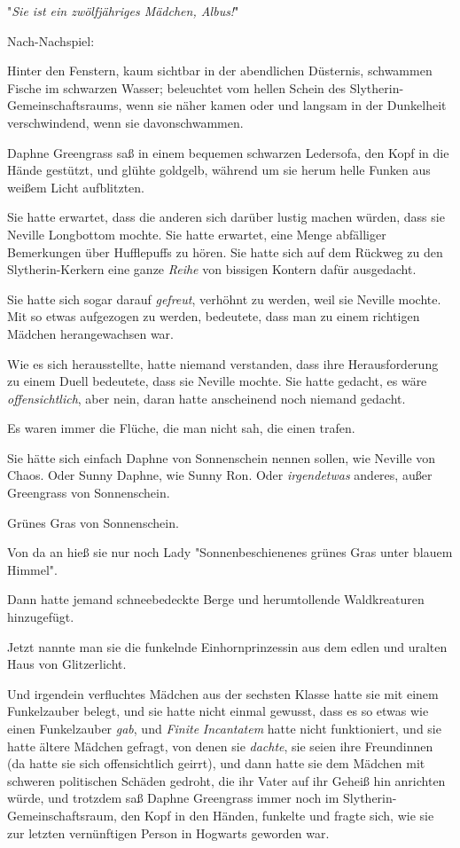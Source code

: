 {"\emph{Sie ist ein zwölfjähriges Mädchen, Albus!}"

Nach-Nachspiel:

Hinter den Fenstern, kaum sichtbar in der abendlichen Düsternis, schwammen Fische im schwarzen Wasser; beleuchtet vom hellen Schein des Slytherin-Gemeinschaftsraums, wenn sie näher kamen oder und langsam in der Dunkelheit verschwindend, wenn sie davonschwammen.

Daphne Greengrass saß in einem bequemen schwarzen Ledersofa, den Kopf in die Hände gestützt, und glühte goldgelb, während um sie herum helle Funken aus weißem Licht aufblitzten.

Sie hatte erwartet, dass die anderen sich darüber lustig machen würden, dass sie Neville Longbottom mochte. Sie hatte erwartet, eine Menge abfälliger Bemerkungen über Hufflepuffs zu hören. Sie hatte sich auf dem Rückweg zu den Slytherin-Kerkern eine ganze \emph{Reihe} von bissigen Kontern dafür ausgedacht.

Sie hatte sich sogar darauf \emph{gefreut}, verhöhnt zu werden, weil sie Neville mochte. Mit so etwas aufgezogen zu werden, bedeutete, dass man zu einem richtigen Mädchen herangewachsen war.

Wie es sich herausstellte, hatte niemand verstanden, dass ihre Herausforderung zu einem Duell bedeutete, dass sie Neville mochte. Sie hatte gedacht, es wäre \emph{offensichtlich}, aber nein, daran hatte anscheinend noch niemand gedacht.

Es waren immer die Flüche, die man nicht sah, die einen trafen.

Sie hätte sich einfach Daphne von Sonnenschein nennen sollen, wie Neville von Chaos. Oder Sunny Daphne, wie Sunny Ron. Oder \emph{irgendetwas} anderes, außer Greengrass von Sonnenschein.

Grünes Gras von Sonnenschein.

Von da an hieß sie nur noch Lady "Sonnenbeschienenes grünes Gras unter blauem Himmel".

Dann hatte jemand schneebedeckte Berge und herumtollende Waldkreaturen hinzugefügt.

Jetzt nannte man sie die funkelnde Einhornprinzessin aus dem edlen und uralten Haus von Glitzerlicht.

Und irgendein verfluchtes Mädchen aus der sechsten Klasse hatte sie mit einem Funkelzauber belegt, und sie hatte nicht einmal gewusst, dass es so etwas wie einen Funkelzauber \emph{gab}, und \emph{Finite} \emph{Incantatem} hatte nicht funktioniert, und sie hatte ältere Mädchen gefragt, von denen sie \emph{dachte}, sie seien ihre Freundinnen (da hatte sie sich offensichtlich geirrt), und dann hatte sie dem Mädchen mit schweren politischen Schäden gedroht, die ihr Vater auf ihr Geheiß hin anrichten würde, und trotzdem saß Daphne Greengrass immer noch im Slytherin-Gemeinschaftsraum, den Kopf in den Händen, funkelte und fragte sich, wie sie zur letzten vernünftigen Person in Hogwarts geworden war.

}
